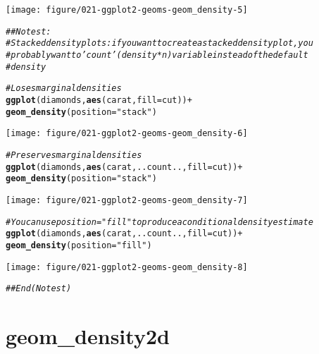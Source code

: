 \documentclass[a4paper,titlepage]{tufte-handout}\usepackage[]{graphicx}\usepackage[]{color}
\makeatletter
\def\maxwidth{ %
  \ifdim\Gin@nat@width>\linewidth
    \linewidth
  \else
    \Gin@nat@width
  \fi
}
\newcommand{\hlstr}[1]{\textcolor[rgb]{0.192,0.494,0.8}{#1}}%
\newcommand{\hlcom}[1]{\textcolor[rgb]{0.678,0.584,0.686}{\textit{#1}}}%
\newcommand{\hlopt}[1]{\textcolor[rgb]{0,0,0}{#1}}%
\newcommand{\hlstd}[1]{\textcolor[rgb]{0.345,0.345,0.345}{#1}}%
\newcommand{\hlkwc}[1]{\textcolor[rgb]{0.333,0.667,0.333}{#1}}%
\newcommand{\hlkwd}[1]{\textcolor[rgb]{0.737,0.353,0.396}{\textbf{#1}}}%
\newenvironment{kframe}{%
 \def\at@end@of@kframe{}%
 \ifinner\ifhmode%
  \def\at@end@of@kframe{\end{minipage}}%
  \begin{minipage}{\columnwidth}%
 \fi\fi%
 \def\FrameCommand##1{\hskip\@totalleftmargin \hskip-\fboxsep
 \colorbox{shadecolor}{##1}\hskip-\fboxsep
     \hskip-\linewidth \hskip-\@totalleftmargin \hskip\columnwidth}%
 \MakeFramed {\advance\hsize-\width
   \@totalleftmargin\z@ \linewidth\hsize
   \@setminipage}}%
 {\par\unskip\endMakeFramed%
 \at@end@of@kframe}
\newenvironment{knitrout}{}{} %
\makeatother
\begin{document}
\begin{knitrout}
\begin{kframe}
{\ttfamily\noindent\color{warningcolor}{\#\# Warning: Removed 45 rows containing non-finite values (stat\_density).}}\end{kframe}
\texttt{[image: figure/021-ggplot2-geoms-geom\_density-5]} 
\begin{kframe}\begin{alltt}
\hlcom{## No test: }
\hlcom{# Stacked density plots: if you want to create a stacked density plot, you}
\hlcom{# probably want to 'count' (density * n) variable instead of the default}
\hlcom{# density}

\hlcom{# Loses marginal densities}
\hlkwd{ggplot}\hlstd{(diamonds,} \hlkwd{aes}\hlstd{(carat,} \hlkwc{fill} \hlstd{= cut))} \hlopt{+}
  \hlkwd{geom_density}\hlstd{(}\hlkwc{position} \hlstd{=} \hlstr{"stack"}\hlstd{)}
\end{alltt}
\end{kframe}
\texttt{[image: figure/021-ggplot2-geoms-geom\_density-6]} 
\begin{kframe}\begin{alltt}
\hlcom{# Preserves marginal densities}
\hlkwd{ggplot}\hlstd{(diamonds,} \hlkwd{aes}\hlstd{(carat, ..count..,} \hlkwc{fill} \hlstd{= cut))} \hlopt{+}
  \hlkwd{geom_density}\hlstd{(}\hlkwc{position} \hlstd{=} \hlstr{"stack"}\hlstd{)}
\end{alltt}
\end{kframe}
\texttt{[image: figure/021-ggplot2-geoms-geom\_density-7]} 
\begin{kframe}\begin{alltt}
\hlcom{# You can use position="fill" to produce a conditional density estimate}
\hlkwd{ggplot}\hlstd{(diamonds,} \hlkwd{aes}\hlstd{(carat, ..count..,} \hlkwc{fill} \hlstd{= cut))} \hlopt{+}
  \hlkwd{geom_density}\hlstd{(}\hlkwc{position} \hlstd{=} \hlstr{"fill"}\hlstd{)}
\end{alltt}
\end{kframe}
\texttt{[image: figure/021-ggplot2-geoms-geom\_density-8]} 
\begin{kframe}\begin{alltt}
\hlcom{## End(No test)}
\end{alltt}
\end{kframe}
\end{knitrout}


\section{geom\_density2d}
\end{document}
